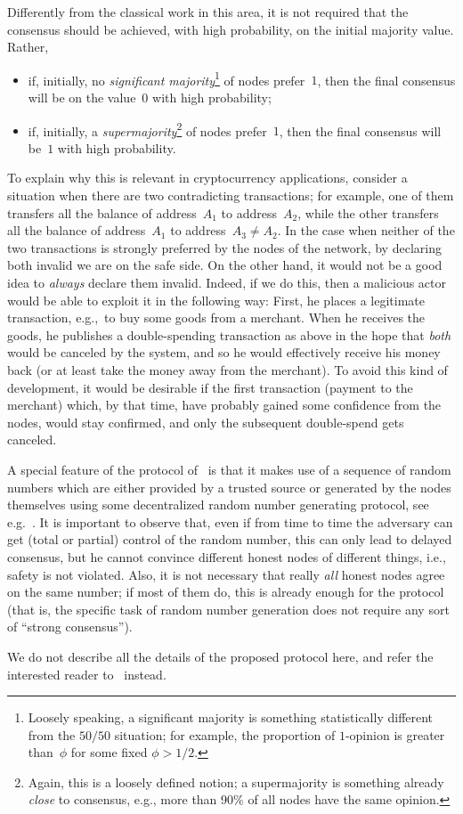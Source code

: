 \documentclass[../main.tex]{subfiles}
\begin{document}
Differently from the classical work
in this area, 
it is not required that
the consensus should be achieved, with high probability, on the initial majority
value.
Rather, 
\begin{itemize}
 \item if, initially, no 
 \emph{significant majority}\footnote{Loosely speaking,
 a significant majority is something statistically 
 different from the $50/50$ situation; for example,
 the proportion of $1$-opinion is greater than~$\phi$
 for some fixed $\phi>1/2$.} 
 of nodes prefer~$1$,
 then the final consensus will be on the value~$0$ 
with high probability;
 \item if, initially, a 
 \emph{supermajority}\footnote{Again, this is 
 a loosely defined notion; 
 a supermajority is something already \emph{close}
 to consensus, e.g., more than 90\% of all nodes 
 have the same opinion.}
 of nodes prefer~$1$,
 then the final consensus will be~$1$ with high probability.
\end{itemize}
To explain why this is relevant in cryptocurrency 
applications, consider a situation when there 
are two contradicting transactions;
for example, one of them transfers all the balance of 
address~$A_1$ to address~$A_2$, while the other
transfers all the balance of 
address~$A_1$ to address~$A_3\neq A_2$.
In the case when neither of the two transactions
is strongly preferred by the nodes of the network,
by declaring both invalid we are on the safe side.
On the other hand, it would not be a good idea to \emph{always}
declare them invalid. Indeed, if we do this, 
then a malicious actor would be able to 
exploit it in the following
way: First, he places a legitimate transaction, e.g.,\
to buy some goods from a merchant. When he receives 
the goods, he publishes a double-spending transaction
as above in the hope that \emph{both} would be
canceled by the system, and so he would effectively
receive his money back (or at least take
the money away from the merchant). To avoid this kind
of development, it would be desirable if the first
transaction (payment to the merchant) which,
by that time, have probably gained some confidence 
 from the nodes, would stay confirmed,
and only the subsequent double-spend gets canceled.

A special feature of the protocol of~\cite{popov2019} is that it makes 
use of a sequence of random numbers which are either
provided by a trusted source or generated
by the nodes themselves using some
decentralized random number generating protocol,
see e.g.~\cite{cascudo2017, popov2017, schindler2018, syta2017}.
It is important to observe that,
even if from time to time the adversary can get
(total or partial) control 
of the random number, this can only lead to delayed consensus,
but he cannot convince different honest nodes of different 
things, i.e., safety is not violated.
Also, it is not necessary that really \emph{all}
honest nodes agree on the same number; if most 
of them do, this is already enough for the 
protocol (that is, the specific task
of random number generation does not require
any sort of ``strong consensus'').

We do not describe all the details of the proposed
protocol here, and refer the interested reader to~\cite{popov2019} instead.
\end{document}
